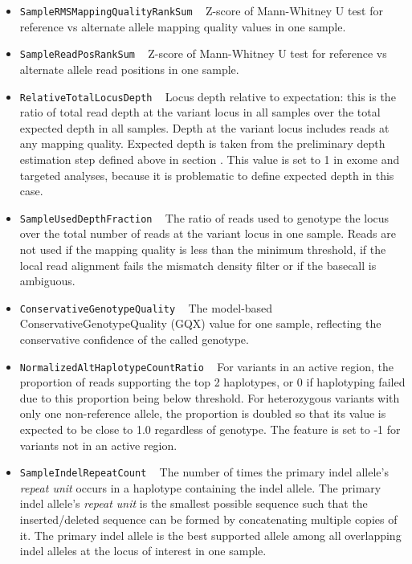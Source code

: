 \documentclass{article}
\begin{document}
\begin{itemize}
    \item \texttt{SampleRMSMappingQualityRankSum} ~ Z-score of Mann-Whitney U test for reference vs alternate allele mapping quality values in one sample.

    \item \texttt{SampleReadPosRankSum} ~ Z-score of Mann-Whitney U test for reference vs alternate allele read positions in one sample.

    \item \texttt{RelativeTotalLocusDepth} ~ Locus depth relative to expectation: this is the ratio of total read depth at the variant locus in all samples over the total expected depth in all samples. Depth at the variant locus includes reads at any mapping quality. Expected depth is taken from the preliminary depth estimation step defined above in section . This value is set to 1 in exome and targeted analyses, because it is problematic to define expected depth in this case.

    \item \texttt{SampleUsedDepthFraction} ~ The ratio of reads used to genotype the locus over the total number of reads at the variant locus in one sample. Reads are not used if the mapping quality is less than the minimum threshold, if the local read alignment fails the mismatch density filter or if the basecall is ambiguous.

    \item \texttt{ConservativeGenotypeQuality} ~ The model-based ConservativeGenotypeQuality (GQX) value for one sample, reflecting the conservative confidence of the called genotype.

    \item \texttt{NormalizedAltHaplotypeCountRatio} ~ For variants in an active region, the proportion of reads supporting the top 2 haplotypes, or 0 if haplotyping failed due to this proportion being below threshold. For heterozygous variants with only one non-reference allele, the proportion is doubled so that its value is expected to be close to 1.0 regardless of genotype. The feature is set to -1 for variants not in an active region.

    \item \texttt{SampleIndelRepeatCount} ~ The number of times the primary indel allele's \emph{repeat unit} occurs in a haplotype containing the indel allele. The primary indel allele's \emph{repeat unit} is the smallest possible sequence such that the inserted/deleted sequence can be formed by concatenating multiple copies of it. The primary indel allele is the best supported allele among all overlapping indel alleles at the locus of interest in one sample.


\end{itemize}
\end{document}
